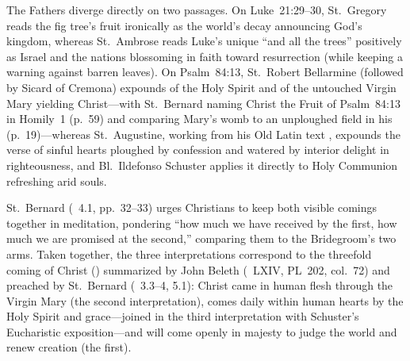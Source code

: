 The Fathers diverge directly on two passages. On Luke~21:29--30, St.~Gregory reads the fig tree's fruit ironically as the world's decay announcing God's kingdom, whereas St.~Ambrose reads Luke's unique ``and all the trees'' positively as Israel and the nations blossoming in faith toward resurrection (while keeping a warning against barren leaves). On Psalm~84:13, St.~Robert Bellarmine (followed by Sicard of Cremona) expounds  of the Holy Spirit and  of the untouched Virgin Mary yielding Christ---with St.~Bernard naming Christ the Fruit of Psalm~84:13 in  Homily~1 (p.~59) and comparing Mary's womb to an unploughed field in his  (p.~19)---whereas St.~Augustine, working from his Old Latin text , expounds the verse of sinful hearts ploughed by confession and watered by interior delight in righteousness, and Bl.~Ildefonso Schuster applies it directly to Holy Communion refreshing arid souls.

St.~Bernard (~4.1, pp.~32--33) urges Christians to keep both visible comings together in meditation, pondering ``how much we have received by the first, how much we are promised at the second,'' comparing them to the Bridegroom's two arms. Taken together, the three interpretations correspond to the threefold coming of Christ () summarized by John Beleth (~LXIV, PL~202, col.~72) and preached by St.~Bernard (~3.3--4, 5.1): Christ came in human flesh through the Virgin Mary (the second interpretation), comes daily within human hearts by the Holy Spirit and grace---joined in the third interpretation with Schuster's Eucharistic exposition---and will come openly in majesty to judge the world and renew creation (the first).

